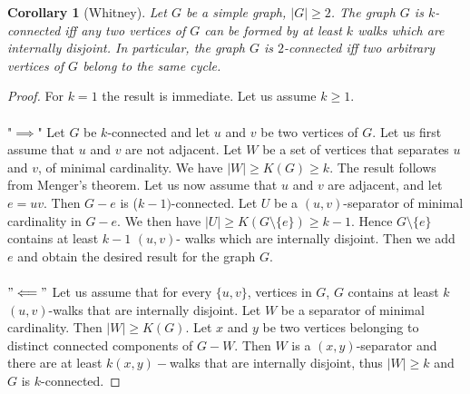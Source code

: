 \documentclass[12pt,a4paper]{article}
\newtheorem{cor}{Corollary}[section]
\theoremstyle{definition}
\begin{document}
\newpage
\begin{cor}[Whitney] Let $G$ be a simple graph, $|G| \geq 2$. The graph $G$ is $k$-connected iff any two vertices of $G$ can be formed by at least $k$ walks which are internally disjoint. In particular, the graph $G$ is $2$-connected iff two arbitrary vertices of $G$ belong to the same cycle. 
\end{cor}
\begin{proof}
 For $k=1$ the result is immediate. Let us assume $k \geq 1$. \\\\
 "$\implies$" Let $G$ be $k$-connected and let $u$ and $v$ be two vertices of $G$. Let us first assume that $u$ and $v$ are not adjacent. Let $W$ be a set of vertices that separates $u$ and $v$, of minimal cardinality. We have $|W| \geq K(G) \geq k$. The result follows from Menger's theorem. Let us now assume that $u$ and $v$ are adjacent, and let $e=uv$. Then $G-e$ is ($k-1)$-connected. Let $U$ be a $(u,v)$-separator of minimal cardinality in $G-e$. We then have $|U| \geq K(G \setminus \{e\}) \geq k-1$. Hence $G \setminus \{e\}$ contains at least $k-1$ $(u,v)$- walks which are internally disjoint. Then we add $e$ and obtain the desired result for the graph $G$. 
 \\\\
 $"\Longleftarrow"$ Let us assume that for every $\{u,v\}$, vertices in $G$, $G$ contains at least $k$ $(u,v)$-walks that are internally disjoint. Let $W$ be a separator of minimal cardinality. Then $|W| \geq K(G)$. Let $x$ and $y$ be two vertices belonging to distinct connected components of $G-W.$ Then $W$ is a $(x, y)$-separator and there are at least $k(x,y)-$walks that are internally disjoint, thus $|W| \geq k$ and $G$ is $k$-connected. 
\end{proof}
\newpage
\end{document}
